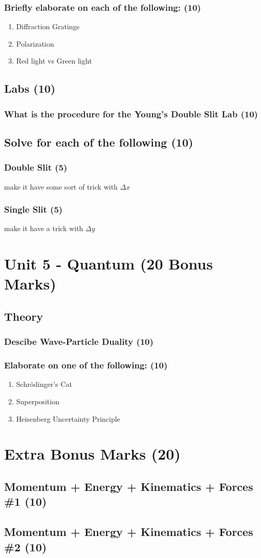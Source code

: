 \documentclass{article}
\begin{document}
\subsubsection{Briefly elaborate on each of the following: (10)}
\begin{enumerate}
    \item Diffraction Gratings
    \item Polarization
    \item Red light vs Green light
\end{enumerate}
\subsection{Labs (10)}
\subsubsection{What is the procedure for the Young's Double Slit Lab (10)}
\subsection{Solve for each of the following (10)}
\subsubsection{Double Slit (5)}
make it have some sort of trick with $\Delta x$

\subsubsection{Single Slit (5)}
make it have a trick with $\Delta y$

\section{Unit 5 - Quantum (20 Bonus Marks)}
\subsection{Theory}
\subsubsection{Descibe Wave-Particle Duality (10)}
\subsubsection{Elaborate on one of the following: (10)}
\begin{enumerate}
    \item Schrödinger's Cat
    \item Superposition
    \item Heisenberg Uncertainty Principle
\end{enumerate}


\section{Extra Bonus Marks (20)}
\subsection{Momentum + Energy + Kinematics + Forces \#1 (10)}
\subsection{Momentum + Energy + Kinematics + Forces \#2 (10)}
\end{document}
